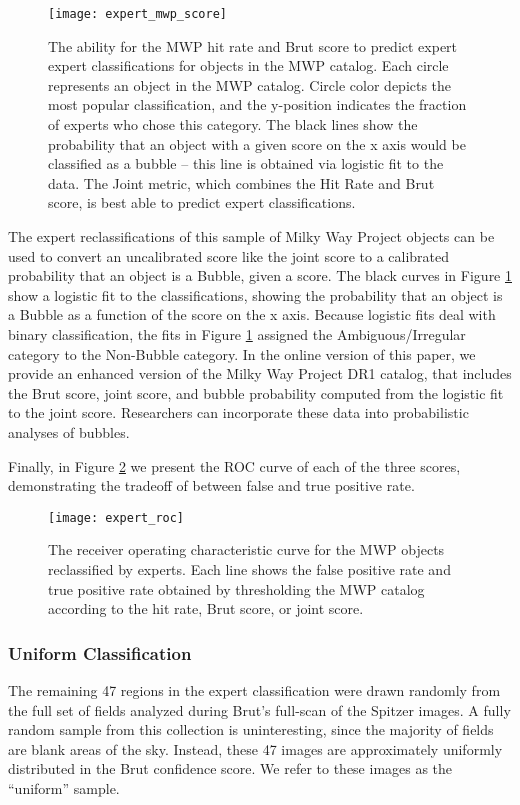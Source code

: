 \documentclass[preprint]{aastex}
\begin{document}
\begin{figure}
\texttt{[image: expert\_mwp\_score]}
\caption{The ability for the MWP hit rate and Brut score to predict expert expert classifications for objects in the MWP catalog. Each circle represents an object in the MWP catalog. Circle color depicts the most popular classification, and the y-position indicates the fraction of experts who chose this category. The
black lines show the probability that an object with a given score on the x axis would be classified as a bubble -- this line is obtained via  logistic fit to the data. The Joint metric, which combines the Hit Rate and Brut score, is best able to predict expert classifications.}
\label{fig:expert_mwp_score}
\end{figure}

The expert reclassifications of this sample of Milky Way Project objects can be used to convert an uncalibrated score like the joint score to a calibrated probability that an object is a Bubble, given a score. The black curves in Figure \ref{fig:expert_mwp_score} show a logistic fit to the classifications, showing the probability that an object is a Bubble as a function of the score on the x axis. Because logistic fits deal with binary classification, the fits in Figure \ref{fig:expert_mwp_score} assigned the Ambiguous/Irregular category to the Non-Bubble category. In the online version of this paper, we provide an enhanced version of the Milky Way Project DR1 catalog, that includes the Brut score, joint score, and bubble probability computed from the logistic fit to the joint score. Researchers can incorporate these data into probabilistic analyses of bubbles.

Finally, in Figure \ref{fig:expert_roc} we present the ROC curve of each of the three scores, demonstrating the tradeoff of between false and true positive rate.

\begin{figure}
\texttt{[image: expert\_roc]}
\caption{The receiver operating characteristic curve for the MWP objects reclassified by experts. Each line shows the false positive rate and true positive rate obtained by thresholding the MWP catalog according to the hit rate, Brut score, or joint score. }
\label{fig:expert_roc}
\end{figure}


\subsubsection{Uniform Classification}
The remaining 47 regions in the expert classification were drawn randomly from the full set of fields analyzed during Brut's full-scan of the Spitzer images. A fully random sample from this collection is uninteresting, since the majority of fields are blank areas of the sky. Instead, these 47 images are approximately uniformly distributed in the Brut confidence score. We refer to these images as the ``uniform'' sample. 
\end{document}
